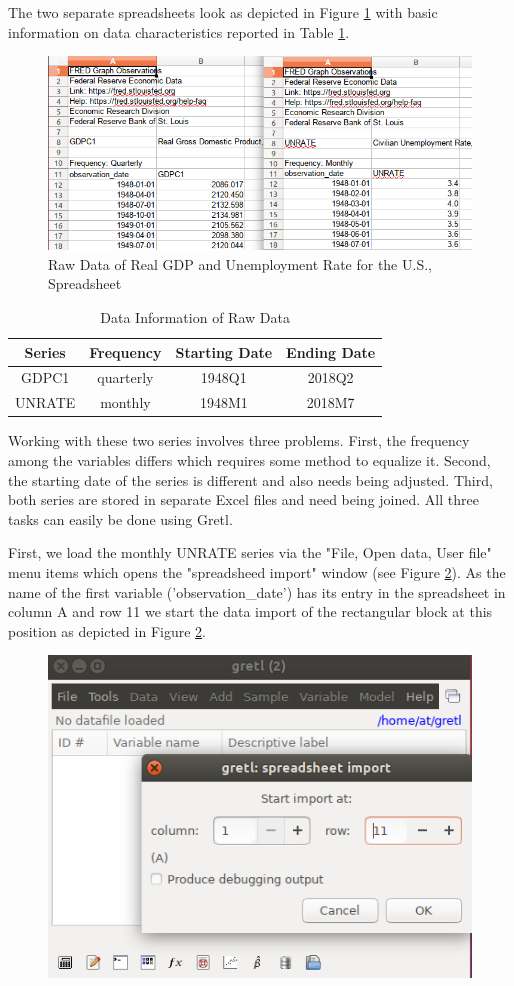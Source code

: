 \documentclass[11pt]{article}
\begin{document}
The two separate spreadsheets look as depicted in Figure \ref{fig:spread} with basic information on data characteristics reported in Table \ref{tab:datainfo}.

\begin{figure}[!h]
	\centering
	\includegraphics[width=.6\textwidth]{../figures/data_spreadsheet}
	\caption{Raw Data of Real GDP and Unemployment Rate for the U.S., Spreadsheet}
	\label{fig:spread}
\end{figure}


\begin{table}[!h]
	\centering
	\footnotesize
	\begin{tabular}{cccc}
		\hline
		Series & Frequency & Starting Date & Ending Date \\ 
		\hline 
		GDPC1	& quarterly & 1948Q1 & 2018Q2 \\ 
		UNRATE	& monthly & 1948M1 & 2018M7 \\ 
		\hline 
	\end{tabular}
	\caption{Data Information of Raw Data}
	\label{tab:datainfo}
\end{table}

Working with these two series involves three problems. First, the frequency among the variables differs which requires some method to equalize it. Second, the starting date of the series is different and also needs being adjusted. Third, both series are stored in separate Excel files and need being joined. All three tasks can easily be done using Gretl.

First, we load the monthly UNRATE series via the "File, Open data, User file" menu items which opens the "spreadsheed import" window (see Figure \ref{fig:load}). As the name of the first variable ('observation\_date') has its entry in the spreadsheet in column A and row 11 we start the data import of the rectangular block at this position as depicted in Figure \ref{fig:load}.

\begin{figure}[!h]
	\centering
	\includegraphics[width=.42\textwidth]{../figures/open_file}
	\caption{}
	\label{fig:load}
\end{figure}
\end{document}
